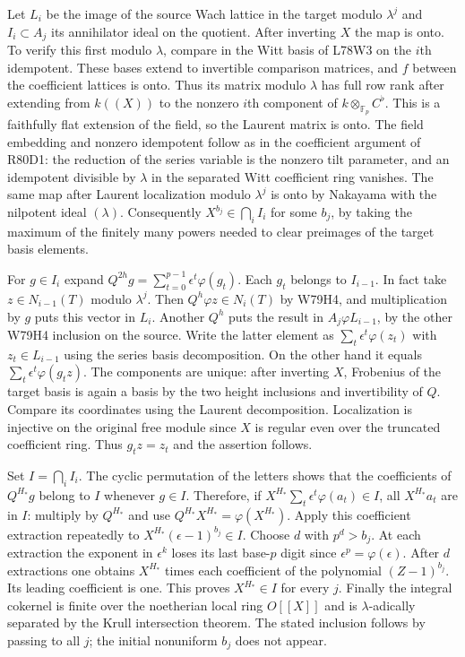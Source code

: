 Let $L_i$ be the image of the source Wach lattice in the target
modulo $\lambda^j$ and $I_i\subset A_j$ its annihilator ideal
on the quotient. After inverting $X$ the map is onto. To verify
this first modulo $\lambda$, compare in the Witt basis of
L78W3 on the $i$th idempotent. These bases extend to invertible
comparison matrices, and $f$ between the coefficient lattices
is onto. Thus its matrix modulo $\lambda$ has full row rank
after extending from $k((X))$ to the nonzero $i$th component
of $k\otimes_{\mathbb F_p} C^\flat$. This is a faithfully flat
extension of the field, so the Laurent matrix is onto.
The field embedding and nonzero idempotent follow as in the
coefficient argument of R80D1: the reduction of the series
variable is the nonzero tilt parameter, and an idempotent
divisible by $\lambda$ in the separated Witt coefficient ring
vanishes. The same map after Laurent localization modulo
$\lambda^j$ is onto by Nakayama with the nilpotent ideal
$(\lambda)$. Consequently $X^{b_j}\in\bigcap_i I_i$ for some
$b_j$, by taking the maximum of the finitely many powers needed
to clear preimages of the target basis elements.

For $g\in I_i$ expand
$Q^{2h}g=\sum_{t=0}^{p-1}\epsilon^t\varphi(g_t)$.
Each $g_t$ belongs to $I_{i-1}$. In fact take
$z\in N_{i-1}(T)$ modulo $\lambda^j$. Then
$Q^h\varphi z\in N_i(T)$ by W79H4, and multiplication by $g$
puts this vector in $L_i$. Another $Q^h$ puts the result in
$A_j\varphi L_{i-1}$, by the other W79H4 inclusion on the source.
Write the latter element as $\sum_t\epsilon^t\varphi(z_t)$
with $z_t\in L_{i-1}$ using the series basis decomposition.
On the other hand it equals
$\sum_t\epsilon^t\varphi(g_t z)$. The components are unique:
after inverting $X$, Frobenius of the target basis is again a
basis by the two height inclusions and invertibility of $Q$.
Compare its coordinates using the Laurent decomposition.
Localization is injective on the original free module since $X$
is regular even over the truncated coefficient ring. Thus
$g_tz=z_t$ and the assertion follows.

Set $I=\bigcap_i I_i$. The cyclic permutation of the letters
shows that the coefficients of $Q^{H_*}g$ belong to $I$
whenever $g\in I$. Therefore, if
$X^{H_*}\sum_t\epsilon^t\varphi(a_t)\in I$, all
$X^{H_*}a_t$ are in $I$: multiply by $Q^{H_*}$ and use
$Q^{H_*}X^{H_*}=\varphi(X^{H_*})$. Apply this coefficient
extraction repeatedly to
$X^{H_*}(\epsilon-1)^{b_j}\in I$. Choose $d$ with $p^d>b_j$.
At each extraction the exponent in $\epsilon^k$ loses its last
base-$p$ digit since $\epsilon^p=\varphi(\epsilon)$.
After $d$ extractions one obtains $X^{H_*}$ times each
coefficient of the polynomial $(Z-1)^{b_j}$. Its leading
coefficient is one. This proves $X^{H_*}\in I$ for every $j$.
Finally the integral cokernel is finite over the noetherian
local ring $O[[X]]$ and is $\lambda$-adically separated by the
Krull intersection theorem. The stated inclusion follows by
passing to all $j$; the initial nonuniform $b_j$ does not appear.

